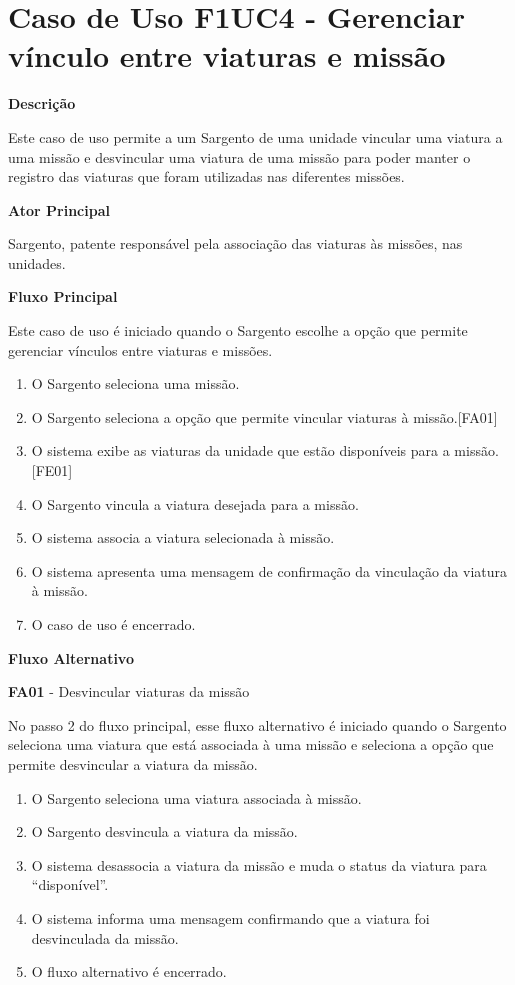 
  \section{Caso de Uso F1UC4 - Gerenciar vínculo entre viaturas e missão}

  {\raggedright
      \textbf{Descrição}
  }

    Este caso de uso permite a um Sargento de uma unidade vincular uma viatura a uma missão e desvincular uma viatura de uma
    missão para poder manter o registro das viaturas que foram utilizadas nas diferentes missões.

    
  {\raggedright
      \textbf{Ator Principal}
  }

     Sargento, patente responsável pela associação das viaturas às missões, nas unidades.

  {\raggedright
      \textbf{Fluxo Principal}
  }
  
    Este caso de uso é iniciado quando o Sargento escolhe a opção que permite gerenciar vínculos entre viaturas e missões.
    
  
  \begin{enumerate}
    \item O Sargento seleciona uma missão.
    \item O Sargento seleciona a opção que permite vincular viaturas à missão.[FA01]
    \item O sistema exibe as viaturas da unidade que estão disponíveis para a missão.[FE01]
    \item O Sargento vincula a viatura desejada para a missão.
    \item O sistema associa a viatura selecionada à missão.
    \item O sistema apresenta uma mensagem de confirmação da vinculação da viatura à missão.
    \item O caso de uso é encerrado.
  \end{enumerate}
  
  {\raggedright
      \textbf{Fluxo Alternativo}
  }
  
    \textbf{FA01} - Desvincular viaturas da missão

  
    No passo 2 do fluxo principal, esse fluxo alternativo é iniciado quando o Sargento seleciona uma viatura que está associada à
    uma missão e seleciona a opção que permite desvincular a viatura da missão.
  
    \begin{enumerate}
      \item O Sargento seleciona uma viatura associada à missão.
      \item O Sargento desvincula a viatura da missão.	
      \item O sistema desassocia a viatura da missão e muda o status da viatura para “disponível”.
      \item O sistema informa uma mensagem confirmando que a viatura foi desvinculada da missão.
      \item O fluxo alternativo é encerrado.
      
    \end{enumerate}
  
